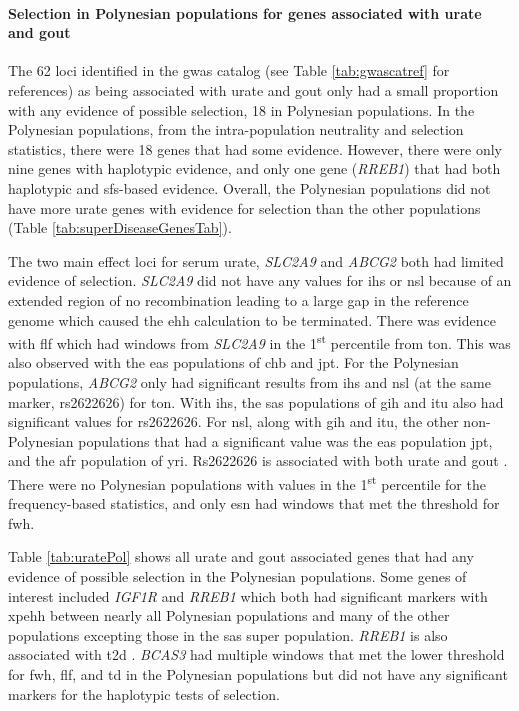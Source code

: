 \documentclass[twoside,openright]{report}
\let\oldparagraph\paragraph
\renewcommand{\paragraph}[1]{\oldparagraph{#1}\mbox{}}
\begin{document}
\FloatBarrier

\paragraph{Selection in Polynesian populations for genes associated with
urate and
gout}\label{selection-in-polynesian-populations-for-genes-associated-with-urate-and-gout}

The 62 loci identified in the \gls{gwas} catalog (see Table
\ref{tab:gwascatref} for references) as being associated with urate and
gout only had a small proportion with any evidence of possible
selection, 18 in Polynesian populations. In the Polynesian populations,
from the intra-population neutrality and selection statistics, there
were 18 genes that had some evidence. However, there were only nine
genes with haplotypic evidence, and only one gene (\emph{RREB1}) that
had both haplotypic and \gls{sfs}-based evidence. Overall, the
Polynesian populations did not have more urate genes with evidence for
selection than the other populations (Table
\ref{tab:superDiseaseGenesTab}).

The two main effect loci for serum urate, \emph{SLC2A9} and \emph{ABCG2}
both had limited evidence of selection. \emph{SLC2A9} did not have any
values for \gls{ihs} or \gls{nsl} because of an extended region of no
recombination leading to a large gap in the reference genome which
caused the \gls{ehh} calculation to be terminated. There was evidence
with \gls{flf} which had windows from \emph{SLC2A9} in the
1\textsuperscript{st} percentile from \gls{ton}. This was also observed
with the \gls{eas} populations of \gls{chb} and \gls{jpt}. For the
Polynesian populations, \emph{ABCG2} only had significant results from
\gls{ihs} and \gls{nsl} (at the same marker, rs2622626) for \gls{ton}.
With \gls{ihs}, the \gls{sas} populations of \gls{gih} and \gls{itu}
also had significant values for rs2622626. For \gls{nsl}, along with
\gls{gih} and \gls{itu}, the other non-Polynesian populations that had a
significant value was the \gls{eas} population \gls{jpt}, and the
\gls{afr} population of \gls{yri}. Rs2622626 is associated with both
urate and gout \citep{Kottgen2013}. There were no Polynesian populations
with values in the 1\textsuperscript{st} percentile for the
frequency-based statistics, and only \gls{esn} had windows that met the
threshold for \gls{fwh}.

Table \ref{tab:uratePol} shows all urate and gout associated genes that
had any evidence of possible selection in the Polynesian populations.
Some genes of interest included \emph{IGF1R} and \emph{RREB1} which both
had significant markers with \gls{xpehh} between nearly all Polynesian
populations and many of the other populations excepting those in the
\gls{sas} super population. \emph{RREB1} is also associated with
\gls{t2d} \citep{mahajan2014genome}. \emph{BCAS3} had multiple windows
that met the lower threshold for \gls{fwh}, \gls{flf}, and \gls{td} in
the Polynesian populations but did not have any significant markers for
the haplotypic tests of selection.
\end{document}
